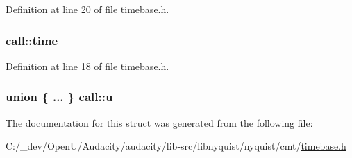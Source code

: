 Definition at line 20 of file timebase.\+h.

\subsubsection[{\texorpdfstring{time}{time}}]{ call\+::time}\hypertarget{structcall_a9283034caf24f8be4e668851ae802ef9}{}\label{structcall_a9283034caf24f8be4e668851ae802ef9}


Definition at line 18 of file timebase.\+h.

\subsubsection[{\texorpdfstring{u}{u}}]{\setlength{\rightskip}{0pt plus 5cm}union \{ ... \}   call\+::u}\hypertarget{structcall_a0f49d493b3e8902b0879fe1c280b408a}{}\label{structcall_a0f49d493b3e8902b0879fe1c280b408a}


The documentation for this struct was generated from the following file\+:\begin{DoxyCompactItemize}
\item 
C\+:/\+\_\+dev/\+Open\+U/\+Audacity/audacity/lib-\/src/libnyquist/nyquist/cmt/\hyperlink{timebase_8h}{timebase.\+h}\end{DoxyCompactItemize}
